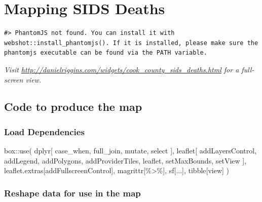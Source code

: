 \documentclass[
]{book}
\newenvironment{Shaded}{\begin{snugshade}}{\end{snugshade}}
\newcommand{\AttributeTok}[1]{\textcolor[rgb]{0.77,0.63,0.00}{#1}}
\newcommand{\FunctionTok}[1]{\textcolor[rgb]{0.00,0.00,0.00}{#1}}
\newcommand{\NormalTok}[1]{#1}
\newcommand{\SpecialCharTok}[1]{\textcolor[rgb]{0.00,0.00,0.00}{#1}}
\newcommand{\StringTok}[1]{\textcolor[rgb]{0.31,0.60,0.02}{#1}}
\begin{document}
\hypertarget{mapping-sids-deaths}{%
\chapter{Mapping SIDS Deaths}\label{mapping-sids-deaths}}

\begin{verbatim}
#> PhantomJS not found. You can install it with webshot::install_phantomjs(). If it is installed, please make sure the phantomjs executable can be found via the PATH variable.
\end{verbatim}

\emph{Visit \url{http://danielriggins.com/widgets/cook_county_sids_deaths.html} for a full-screen view.}

\hypertarget{code-to-produce-the-map}{%
\section{Code to produce the map}\label{code-to-produce-the-map}}

\hypertarget{load-dependencies}{%
\subsection{Load Dependencies}\label{load-dependencies}}

\begin{Shaded}
\begin{Highlighting}[]
\NormalTok{box}\SpecialCharTok{::}\FunctionTok{use}\NormalTok{(}
\NormalTok{    dplyr[}
\NormalTok{        case\_when,}
\NormalTok{        full\_join,}
\NormalTok{        mutate,}
\NormalTok{        select}
\NormalTok{    ],}
\NormalTok{    leaflet[}
\NormalTok{        addLayersControl,}
\NormalTok{        addLegend,}
\NormalTok{        addPolygons,}
\NormalTok{        addProviderTiles, }
\NormalTok{        leaflet, }
\NormalTok{        setMaxBounds, }
\NormalTok{        setView}
\NormalTok{    ],}
\NormalTok{    leaflet.extras[addFullscreenControl],}
\NormalTok{    magrittr[}\StringTok{\textasciigrave{}}\AttributeTok{\%\textgreater{}\%}\StringTok{\textasciigrave{}}\NormalTok{],}
\NormalTok{    sf[...],}
\NormalTok{    tibble[view]}
\NormalTok{)}
\end{Highlighting}
\end{Shaded}

\hypertarget{reshape-data-for-use-in-the-map}{%
\subsection{Reshape data for use in the map}\label{reshape-data-for-use-in-the-map}}
\end{document}
